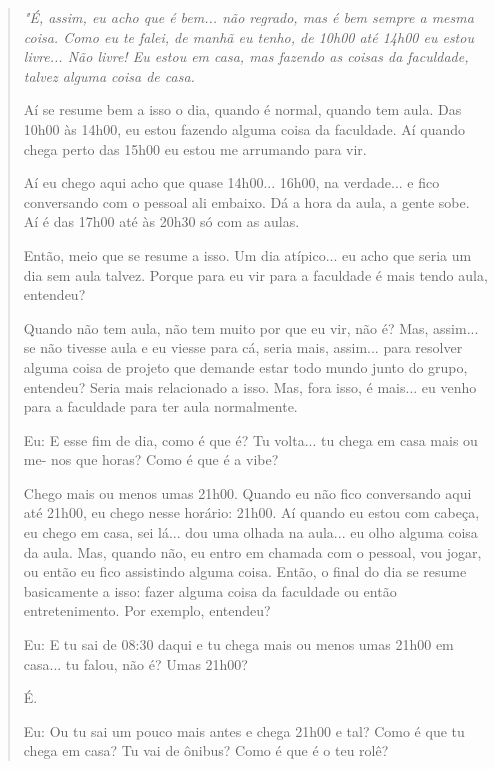 \begin{quote}
    \itshape
    "É, assim, eu acho que é bem... não regrado, mas é bem sempre a mesma coisa. Como eu te falei, de manhã eu tenho, de 10h00 até 14h00 eu estou livre... Não livre! Eu estou em casa, mas fazendo as coisas da faculdade, talvez alguma coisa de casa.

    Aí se resume bem a isso o dia, quando é normal, quando tem aula. Das 10h00 às 14h00, eu estou fazendo alguma coisa da faculdade. Aí quando chega perto das 15h00 eu estou me arrumando para vir. 

    Aí eu chego aqui acho que quase 14h00... 16h00, na verdade... e fico conversando com o pessoal ali embaixo. Dá a hora da aula, a gente sobe. Aí é das 17h00 até às 20h30 só com as aulas. 
    
    Então, meio que se resume a isso. Um dia atípico... eu acho que seria um dia sem aula talvez. Porque para eu vir para a faculdade é mais tendo aula, entendeu?

    Quando não tem aula, não tem muito por que eu vir, não é? Mas, assim... se não tivesse aula e eu viesse para cá, seria mais, assim... para resolver alguma coisa de projeto que demande estar todo mundo junto do grupo, entendeu? Seria mais relacionado a isso. Mas, fora isso, é mais... eu venho para a faculdade para ter aula normalmente. 

    \colorbox{black!15}{Eu: E esse fim de dia, como é que é? Tu volta... tu chega em casa mais ou me-}
    \colorbox{black!15}{nos que horas? Como é que é a vibe?}
    
    Chego mais ou menos umas 21h00. Quando eu não fico conversando aqui até 21h00, eu chego nesse horário: 21h00. Aí quando eu estou com cabeça, eu chego em casa, sei lá... dou uma olhada na aula... eu olho alguma coisa da aula. Mas, quando não, eu entro em chamada com o pessoal, vou jogar, ou então eu fico assistindo alguma coisa. Então, o final do dia se resume basicamente a isso: fazer alguma coisa da faculdade ou então entretenimento. Por exemplo, entendeu?

    \colorbox{black!15}{Eu: E tu sai de 08:30 daqui e tu chega mais ou menos umas 21h00 em casa... tu}
    \colorbox{black!15}{falou, não é? Umas 21h00?}
    
    É. 

    \colorbox{black!15}{Eu: Ou tu sai um pouco mais antes e chega 21h00 e tal? Como é que tu chega em}
    \colorbox{black!15}{casa? Tu vai de ônibus? Como é que é o teu rolê?}


\end{quote}
